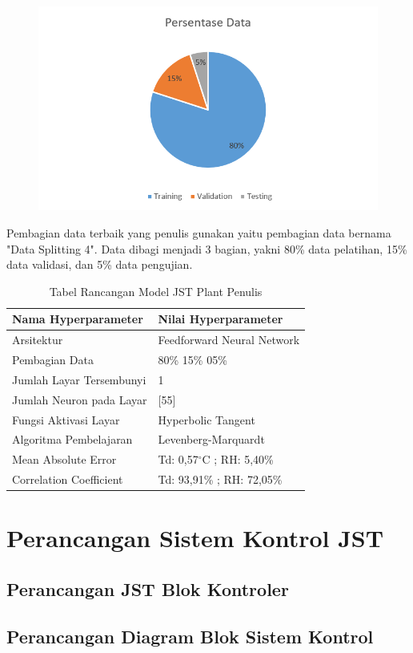 \begin{figure}[!h]
	\centering
	\includegraphics[width=1\textwidth]{figures/DataSplittingFinal}
	\caption{}
	\label{fig:5:DataSplittingFinal}
\end{figure}

Pembagian data terbaik yang penulis gunakan yaitu pembagian data bernama "Data Splitting 4". Data dibagi menjadi 3 bagian, yakni 80\% data pelatihan, 15\% data validasi, dan 5\% data pengujian.\\

\begin{table}[!h]
	\caption{Tabel Rancangan Model JST Plant Penulis}
	\label{tbl:5:NNPlantRidhan}
	\centering
	\begin{tabular}{|p{5.7cm}|p{5cm}|}
		\hline
		\textbf{Nama Hyperparameter} & \textbf{Nilai Hyperparameter} \\ \hline
		Arsitektur & Feedforward Neural Network \\ \hline
		Pembagian Data & 80\% 15\% 05\% \\ \hline 
		Jumlah Layar Tersembunyi & 1 \\ \hline
		Jumlah Neuron pada Layar & [55] \\ \hline
		Fungsi Aktivasi Layar & Hyperbolic Tangent \\ \hline
		Algoritma Pembelajaran & Levenberg-Marquardt \\ \hline
		Mean Absolute Error & Td: 0,57$^\circ$C ; RH: 5,40\% \\ \hline
		Correlation Coefficient & Td: 93,91\% ; RH: 72,05\% \\ \hline
	\end{tabular}
\end{table}


\section{Perancangan Sistem Kontrol JST}

\subsection{Perancangan JST Blok Kontroler}

\subsection{Perancangan Diagram Blok Sistem Kontrol}
